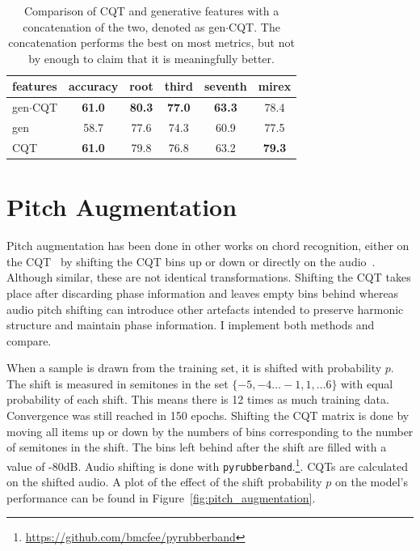 \begin{table}
    \centering
    \begin{tabular}{lccccc}
        \toprule
        features & accuracy & root  & third & seventh & mirex \\  
        \midrule
        gen$\cdot$CQT  & \textbf{61.0}     & \textbf{80.3}  & \textbf{77.0}  & \textbf{63.3}    & 78.4  \\
        gen      & 58.7     & 77.6  & 74.3  & 60.9    & 77.5  \\
        CQT      & \textbf{61.0}     & 79.8  & 76.8  & 63.2    & \textbf{79.3}  \\
        \bottomrule
    \end{tabular}
    \caption{Comparison of CQT and generative features with a concatenation of the two, denoted as gen$\cdot$CQT. The concatenation performs the best on most metrics, but not by enough to claim that it is meaningfully better. }\label{tab:gen_feature_comparison}
\end{table}

\section{Pitch Augmentation}\label{sec:pitch-augmentation}

Pitch augmentation has been done in other works on chord recognition, either on the CQT~\citep{ACRLargeVocab1} by shifting the CQT bins up or down or directly on the audio~\citep{BTC,StructuredTraining}. Although similar, these are not identical transformations. Shifting the CQT takes place after discarding phase information and leaves empty bins behind whereas audio pitch shifting can introduce other artefacts intended to preserve harmonic structure and maintain phase information. I implement both methods and compare.

When a sample is drawn from the training set, it is shifted with probability $p$. The shift is measured in semitones in the set $\{-5,-4\ldots -1, 1, \ldots 6\}$ with equal probability of each shift. This means there is 12 times as much training data. Convergence was still reached in 150 epochs. Shifting the CQT matrix is done by moving all items up or down by the numbers of bins corresponding to the number of semitones in the shift. The bins left behind after the shift are filled with a value of -80dB. Audio shifting is done with \texttt{pyrubberband}.\footnote{\url{https://github.com/bmcfee/pyrubberband}}. CQTs are calculated on the shifted audio. A plot of the effect of the shift probability $p$ on the model's performance can be found in Figure~\ref{fig:pitch_augmentation}.

